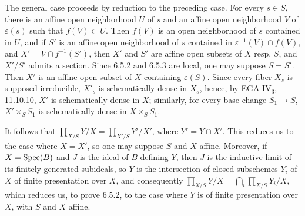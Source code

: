 The general case proceeds by reduction to the preceding case. For every $s\in S$, there is an affine open neighborhood $U$ of $s$ and an affine open neighborhood $V$ of $\varepsilon(s)$ such that $f(V)\subset U$. Then $f(V)$ is an open neighborhood of $s$ contained in $U$, and if $S'$ is an affine open neighborhood of $s$ contained in $\varepsilon^{-1}(V)\cap f(V)$, and $X'=V\cap f^{-1}(S')$, then $X'$ and $S'$ are affine open subsets of $X$ resp. $S$, and $X'/S'$ admits a section. Since 6.5.2 and 6.5.3 are local, one may suppose $S=S'$. Then $X'$ is an affine open subset of $X$ containing $\varepsilon(S)$. Since every fiber $X_s$ is supposed irreducible, $X'_s$ is schematically dense in $X_s$, hence, by EGA IV$_3$, 11.10.10, $X'$ is schematically dense in $X$; similarly, for every base change $S_1\to S$, $X'\times_SS_1$ is schematically dense in $X\times_SS_1$.

It follows that $\prod_{X/S}Y/X=\prod_{X'/S}Y'/X'$, where $Y'=Y\cap X'$. This reduces us to the case where $X=X'$, so one may suppose $S$ and $X$ affine. Moreover, if $X=\operatorname{Spec}(B)$ and $J$ is the ideal of $B$ defining $Y$, then $J$ is the inductive limit of its finitely generated subideals, so $Y$ is the intersection of closed subschemes $Y_i$ of $X$ of finite presentation over $X$, and consequently $\prod_{X/S}Y/X=\bigcap_i\prod_{X/S}Y_i/X$, which reduces us, to prove 6.5.2, to the case where $Y$ is of finite presentation over $X$, with $S$ and $X$ affine.

